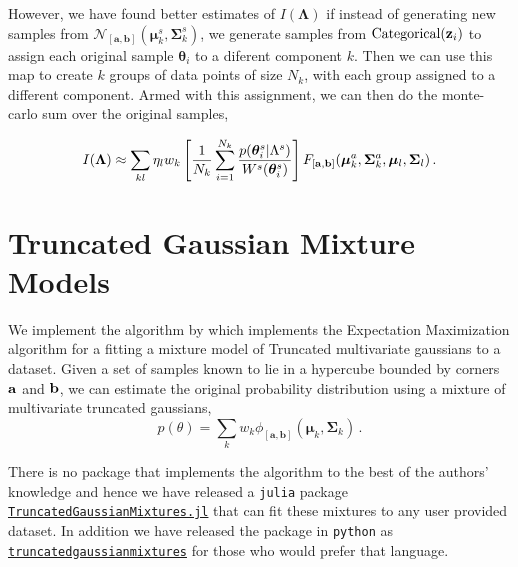 \documentclass[twocolumn,usenames,dvipsnames,linenumbers]{aastex631}
\newcommand{\btheta}{\boldsymbol{\theta}}
\newcommand{\bmu}{\boldsymbol{\mu}}
\newcommand{\bSigma}{\boldsymbol{\Sigma}}
\newcommand{\bLambda}{\boldsymbol{\Lambda}}
\newcommand{\ba}{{\bf a}}
\newcommand{\bb}{{\bf b}}
\begin{document}
However, we have found better estimates of $I(\bLambda)$ if instead of generating new samples from $\mathcal{N}_{[\boldsymbol{a},\boldsymbol{b}]}(\boldsymbol{\mu}^s_k ,\boldsymbol{\Sigma}^s_k)$, we generate samples from $\text{Categorical}({\bf z}_i)$ to assign each original sample $\btheta_i$ to a diferent component $k$. Then we can use this map to create $k$ groups of data points of size $N_k$, with each group assigned to a different component. Armed with this assignment, we can then do the monte-carlo sum over the original samples, 

 \begin{equation}
		I(\bLambda) \approx   \sum_{kl} \eta_l w_k \left[ \frac{1}{N_k}\sum_{i=1}^{N_k} \frac{p(\btheta^s_i|\Lambda^s)}{W^s(\btheta^s_i)}  \right] F_{[\ba, \bb]}(\bmu^a_k, \bSigma^a_k,\bmu_l, \bSigma_l)\,.
		\label{eq:hybrid-scheme}
\end{equation}


\section{Truncated Gaussian Mixture Models}
\label{sec:TGMM}
We implement the algorithm by \cite{Lee2012} which implements the Expectation Maximization algorithm for a fitting a mixture model of Truncated multivariate gaussians to a dataset. Given a set of samples known to lie in a hypercube bounded by corners $\ba$ and $\bb$, we can estimate the original probability distribution using a mixture of multivariate truncated gaussians,
\begin{equation}
	p(\theta) = \sum_k w_k \phi_{[\boldsymbol{a},\boldsymbol{b}]}(\boldsymbol{\mu}_k ,\boldsymbol{\Sigma}_k)\,.
\end{equation}

There is no package that implements the algorithm to the best of the authors' knowledge and hence we have released a \texttt{julia} package \href{https://github.com/Potatoasad/TruncatedGaussianMixtures.jl}{\texttt{TruncatedGaussianMixtures.jl}} that can fit these mixtures to any user provided dataset. In addition we have released the package in \texttt{python} as \href{https://github.com/Potatoasad/truncatedgaussianmixtures}{\texttt{truncatedgaussianmixtures}}  for those who would prefer that language.
\end{document}
